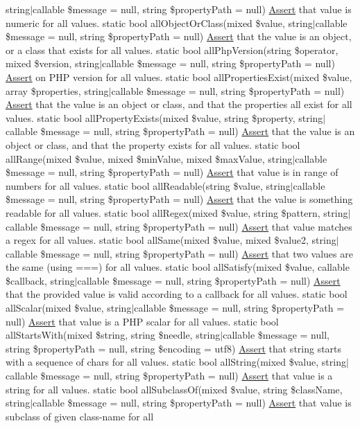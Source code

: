 string$\vert$callable \$message = null, string \$property\+Path = null) \mbox{\hyperlink{class_assert_1_1_assert}{Assert}} that value is numeric for all values.  static bool all\+Object\+Or\+Class(mixed \$value, string$\vert$callable \$message = null, string \$property\+Path = null) \mbox{\hyperlink{class_assert_1_1_assert}{Assert}} that the value is an object, or a class that exists for all values.  static bool all\+Php\+Version(string \$operator, mixed \$version, string$\vert$callable \$message = null, string \$property\+Path = null) \mbox{\hyperlink{class_assert_1_1_assert}{Assert}} on P\+HP version for all values.  static bool all\+Properties\+Exist(mixed \$value, array \$properties, string$\vert$callable \$message = null, string \$property\+Path = null) \mbox{\hyperlink{class_assert_1_1_assert}{Assert}} that the value is an object or class, and that the properties all exist for all values.  static bool all\+Property\+Exists(mixed \$value, string \$property, string$\vert$callable \$message = null, string \$property\+Path = null) \mbox{\hyperlink{class_assert_1_1_assert}{Assert}} that the value is an object or class, and that the property exists for all values.  static bool all\+Range(mixed \$value, mixed \$min\+Value, mixed \$max\+Value, string$\vert$callable \$message = null, string \$property\+Path = null) \mbox{\hyperlink{class_assert_1_1_assert}{Assert}} that value is in range of numbers for all values.  static bool all\+Readable(string \$value, string$\vert$callable \$message = null, string \$property\+Path = null) \mbox{\hyperlink{class_assert_1_1_assert}{Assert}} that the value is something readable for all values.  static bool all\+Regex(mixed \$value, string \$pattern, string$\vert$callable \$message = null, string \$property\+Path = null) \mbox{\hyperlink{class_assert_1_1_assert}{Assert}} that value matches a regex for all values.  static bool all\+Same(mixed \$value, mixed \$value2, string$\vert$callable \$message = null, string \$property\+Path = null) \mbox{\hyperlink{class_assert_1_1_assert}{Assert}} that two values are the same (using ===) for all values.  static bool all\+Satisfy(mixed \$value, callable \$callback, string$\vert$callable \$message = null, string \$property\+Path = null) \mbox{\hyperlink{class_assert_1_1_assert}{Assert}} that the provided value is valid according to a callback for all values.  static bool all\+Scalar(mixed \$value, string$\vert$callable \$message = null, string \$property\+Path = null) \mbox{\hyperlink{class_assert_1_1_assert}{Assert}} that value is a P\+HP scalar for all values.  static bool all\+Starts\+With(mixed \$string, string \$needle, string$\vert$callable \$message = null, string \$property\+Path = null, string \$encoding = \textquotesingle{}utf8\textquotesingle{}) \mbox{\hyperlink{class_assert_1_1_assert}{Assert}} that string starts with a sequence of chars for all values.  static bool all\+String(mixed \$value, string$\vert$callable \$message = null, string \$property\+Path = null) \mbox{\hyperlink{class_assert_1_1_assert}{Assert}} that value is a string for all values.  static bool all\+Subclass\+Of(mixed \$value, string \$class\+Name, string$\vert$callable \$message = null, string \$property\+Path = null) \mbox{\hyperlink{class_assert_1_1_assert}{Assert}} that value is subclass of given class-\/name for all 